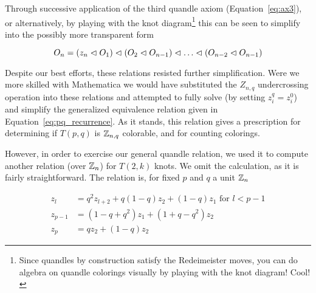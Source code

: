 \documentclass[paper.tex]{subfiles}
\begin{document}
Through successive application of the third quandle axiom (Equation~\ref{eq:ax3}), or alternatively, by playing with the knot diagram\footnote{Since quandles by construction satisfy the Redeimeister moves, you can do algebra
        on quandle colorings visually by playing with the knot diagram! Cool!} this can be seen to simplify into the possibly more transparent form

\begin{equation}
   O_n = (z_n \vartriangleleft O_1) \vartriangleleft (O_2 \vartriangleleft O_{n -1}) \vartriangleleft \ldots \vartriangleleft (O_{n - 2} \vartriangleleft O_{n - 1})
\end{equation}

Despite our best efforts, these relations resisted further simplification. Were we more skilled with Mathematica we would have substituted the $Z_{n,q}$ undercrossing operation into these relations
     and attempted to fully solve (by setting $z^q_{i} = z^0_{i}$) and simplify the generalized equivalence relation given in Equation~\ref{eq:pq_recurrence}. As it stands, this relation gives a prescription for
     determining if $T(p,q)$ is $\mathbb{Z}_{n,q}$ colorable, and for counting colorings.

However, in order to exercise our general quandle relation, we used it to compute another relation (over $\mathbb{Z}_n$) for $T(2, k)$ knots. We omit the calculation, as it is fairly straightforward. The relation is, for fixed $p$
      and $q$ a unit $\mathbb{Z}_n$

\begin{align}
    z_l &= q^2 z_{l + 2} + q(1 - q) z_2 + (1 - q) z_1 \text{ for } l < p -1\\
    z_{p - 1} &= (1 - q + q^2) z_1 + (1 + q - q^2) z_2 \\
    z_p  &= q z_2 + (1 - q) z_2
\end{align}
\end{document}
